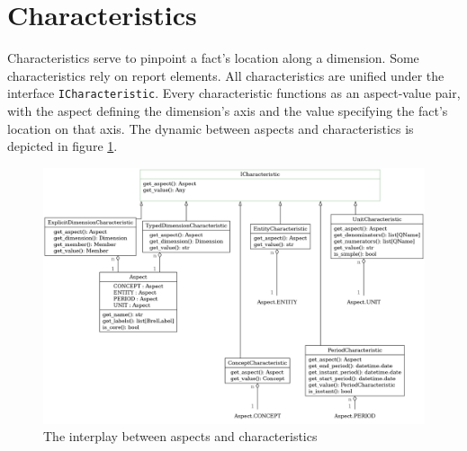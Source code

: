 \section{Characteristics}
\label{sec:characteristics}

Characteristics serve to pinpoint a fact's location along a dimension. 
Some characteristics rely on report elements.
All characteristics are unified under the interface \texttt{ICharacteristic}. 
Every characteristic functions as an aspect-value pair, 
with the aspect defining the dimension's axis and the value specifying the fact's location on that axis. 
The dynamic between aspects and characteristics is depicted in figure \ref{fig:characteristics}.

\begin{figure}[H]
    \centering
    \includegraphics[width=\textwidth]{images/brel_characteristics_classes.png}
    \caption{The interplay between aspects and characteristics}
    \label{fig:characteristics}
\end{figure}


